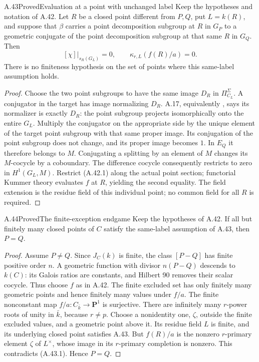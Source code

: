 \begin{claim}{A.43}{Proved}{Evaluation at a point with unchanged label}
Keep the hypotheses and notation of A.42. Let $R$ be a closed
point different from $P,Q$, put $L=k(R)$, and suppose that
$\beta$ carries a point decomposition subgroup at $R$ in $G_P$
to a geometric conjugate of the point decomposition subgroup
at that same $R$ in $G_Q$. Then
\[
             [\chi]|_{s_R(G_L)}=0,
             \qquad \kappa_{r,L}(f(R)/a)=0.               \tag{A.43.1}
\]
There is no finiteness hypothesis on the set of points where
this same-label assumption holds.
\end{claim}
\begin{proof}
Choose the two point subgroups to have the same image $D_R$
in $\Pi_{C_L}^\Sigma$. A conjugator in the target has image
normalizing $D_R$. A.17, equivalently
\citet[Lemma 1.7]{ST2009}, says its normalizer is exactly
$D_R$: the point subgroup projects isomorphically onto the
entire $G_L$. Multiply the conjugator on the appropriate side
by the unique element of the target point subgroup with
that same proper image. Its conjugation of the point subgroup
does not change, and its proper image becomes $1$.
In $E_Q$ it therefore belongs to $M$. Conjugating a splitting
by an element of $M$ changes its $M$-cocycle by a coboundary.
The difference cocycle consequently restricts to zero in
$H^1(G_L,M)$. Restrict (A.42.1) along the actual point section;
functorial Kummer theory evaluates $f$ at $R$, yielding the
second equality. The field extension is the residue field of
this individual point; no common field for all $R$ is required.
\end{proof}

\begin{claim}{A.44}{Proved}{The finite-exception endgame}
Keep the hypotheses of A.42. If all but finitely many closed
points of $C$ satisfy the same-label assumption of A.43, then
$P=Q$.
\end{claim}
\begin{proof}
Assume $P\ne Q$. Since $J_C(k)$ is finite, the class $[P-Q]$
has finite positive order $n$. A geometric function with divisor
$n(P-Q)$ descends to $k(C)$: its Galois ratios are constants,
and Hilbert 90 removes their scalar cocycle. Thus choose $f$
as in A.42. The finite excluded set has only finitely many
geometric points and hence finitely many values under $f/a$.
The finite nonconstant map $f/a:C_{\bar k}\to\mathbf P^1$
is surjective. There are infinitely many $r$-power roots of
unity in $\bar k$, because $r\ne p$. Choose a nonidentity
one, $\zeta$, outside the finite excluded values, and a
geometric point above it. Its residue field $L$ is finite,
and its underlying closed point satisfies A.43. But $f(R)/a$
is the nonzero $r$-primary element $\zeta$ of $L^\times$,
whose image in its $r$-primary completion is nonzero.
This contradicts (A.43.1). Hence $P=Q$.
\end{proof}

